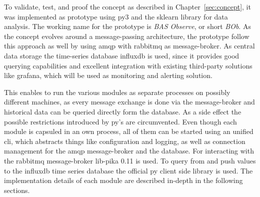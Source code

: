 
\begin{comment}
\begin{itemize}
	\item implementation in \gls{py} 3
	\item command line interface with subcommand as central entrypoint providing configuration and log management
	\item each process is run as separate processes to mitigate \gls{gil} limitations
	\item process has one task (agent simulator, collector, analyser module)
	\item modules/process pass messages mainly using \gls{amqp} and \gls{rabbitmq} as message broker
	\item reusing \gls{influxdb} and \gls{rabbitmq} by separating pipelines using a project name
\end{itemize}
\end{comment}

To validate, test, and proof the concept as described in Chapter~\ref{sec:concept}, it was implemented as prototype using \gls{py}3 and the \gls{sklearn} library for data analysis.
The working name for the prototype is \emph{BAS Observe}, or short \emph{BOb}.
As the concept evolves around a message-passing architecture, the prototype follow this approach as well by using \gls{amqp} with \gls{rabbitmq} as message-broker. As central data storage the time-series database \gls{influxdb} is used, since it provides good querying capabilities and excellent integration with existing third-party solutions like \gls{grafana}, which will be used as monitoring and alerting solution.

This enables to run the various modules as separate processes on possibly different machines, as every message exchange is done via the message-broker and historical data can be queried directly form the database.
As a side effect the possible restrictions introduced by \gls{py}'s  are circumvented.
Even though each module is capsuled in an own process, all of them can be started using an unified \gls{cli}, which abstracts things like configuration and logging, as well as connection management for the \gls{amqp} message-broker and the database.
For interacting with the \gls{rabbitmq} message-broker \gls{lib-pika} 0.11 is used. To query from and push values to the \gls{influxdb} time series database the official \gls{py} client side library is used.
The implementation details of each module are described in-depth in the following sections.

